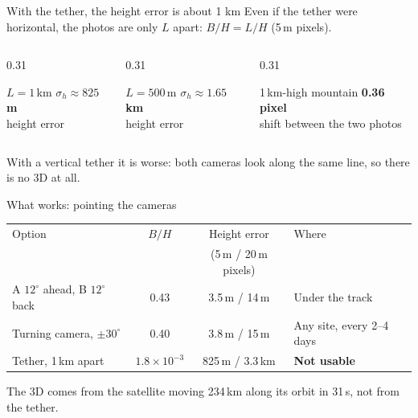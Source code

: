 \documentclass[aspectratio=169,11pt]{beamer}
\begin{document}
\begin{frame}{With the tether, the height error is about 1 km}
Even if the tether were horizontal, the photos are only $L$ apart: $B/H = L/H$ (5\,m pixels).
\vspace{0.4cm}
\begin{columns}[T]
\begin{column}{0.31\textwidth}
\begin{block}{$L = 1$\,km}
\centering
{\Large\bfseries $\sigma_h \approx 825$\,m}\\[2pt]
\footnotesize height error
\end{block}
\end{column}
\begin{column}{0.31\textwidth}
\begin{block}{$L = 500$\,m}
\centering
{\Large\bfseries $\sigma_h \approx 1.65$\,km}\\[2pt]
\footnotesize height error
\end{block}
\end{column}
\begin{column}{0.31\textwidth}
\begin{block}{1\,km-high mountain}
\centering
{\Large\bfseries 0.36 pixel}\\[2pt]
\footnotesize shift between the two photos
\end{block}
\end{column}
\end{columns}
\vspace{0.5cm}
With a vertical tether it is worse: both cameras look along the same line, so there is no 3D at all.
\end{frame}
\begin{frame}{What works: pointing the cameras}
\centering
\renewcommand{\arraystretch}{1.35}
\small
\begin{tabular}{@{}lccl@{}}
\toprule
Option & $B/H$ & Height error & Where \\
 & & (5\,m / 20\,m pixels) & \\
\midrule
A $12^\circ$ ahead, B $12^\circ$ back & 0.43 & 3.5\,m / 14\,m & Under the track \\
Turning camera, $\pm30^\circ$ & 0.40 & 3.8\,m / 15\,m & Any site, every 2--4 days \\
Tether, 1\,km apart & $1.8\times10^{-3}$ & 825\,m / 3.3\,km & \textbf{Not usable} \\
\bottomrule
\end{tabular}

\vspace{0.5cm}
\begin{block}{}
\centering The 3D comes from the satellite moving 234\,km along its orbit in 31\,s, not from the tether.
\end{block}
\end{frame}
\end{document}

